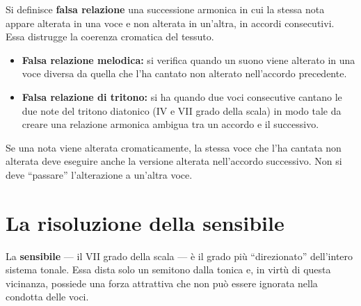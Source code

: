 \begin{definizione}
	\label{def:falsa_relazione}
	Si definisce \textbf{falsa relazione} una successione armonica in cui la stessa nota appare alterata in una voce e non alterata in un'altra, in accordi consecutivi. Essa distrugge la coerenza cromatica del tessuto.
	\begin{itemize}
		\item \textbf{Falsa relazione melodica:} si verifica quando un suono viene alterato in una voce diversa da quella che l'ha cantato non alterato nell'accordo precedente.
		\item \textbf{Falsa relazione di tritono:} si ha quando due voci consecutive cantano le due note del tritono diatonico (IV e VII grado della scala) in modo tale da creare una relazione armonica ambigua tra un accordo e il successivo.
	\end{itemize}
\end{definizione}

\begin{regola}
	\label{reg:evitare_falsa_relazione}
	Se una nota viene alterata cromaticamente, la stessa voce che l'ha cantata non alterata deve eseguire anche la versione alterata nell'accordo successivo. Non si deve ``passare'' l'alterazione a un'altra voce.
\end{regola}

\section{La risoluzione della sensibile}
\label{sec:risoluzione_sensibile}

La \textbf{sensibile} --- il VII grado della scala --- è il grado più ``direzionato'' dell'intero sistema tonale. Essa dista solo un semitono dalla tonica e, in virtù di questa vicinanza, possiede una forza attrattiva che non può essere ignorata nella condotta delle voci.

